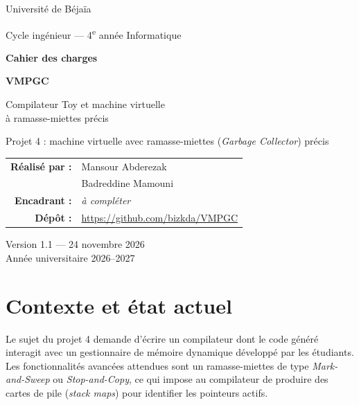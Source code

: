 \documentclass[11pt,a4paper]{article}
\newcommand{\encadrant}{\textit{à compléter}}
\begin{document}
\begin{titlepage}
\centering
{\large Université de Béjaïa\par}
\vspace{2mm}
{\normalsize Cycle ingénieur --- 4\textsuperscript{e} année Informatique\par}

\vspace{3cm}
{\Large\bfseries Cahier des charges\par}
\vspace{6mm}
{\fontsize{34}{40}\selectfont\bfseries VMPGC\par}
\vspace{6mm}
{\large Compilateur Toy et machine virtuelle\\à ramasse-miettes précis\par}
\vspace{8mm}
{\normalsize Projet 4 : machine virtuelle avec ramasse-miettes (\emph{Garbage Collector}) précis\par}

\vfill
\begin{tabular}{rl}
  \textbf{Réalisé par :} & Mansour Abderezak \\
                         & Badreddine Mamouni \\[4mm]
  \textbf{Encadrant :}   & \encadrant \\[4mm]
  \textbf{Dépôt :}       & \url{https://github.com/bizkda/VMPGC} \\
\end{tabular}

\vspace{1.5cm}
Version 1.1 --- 24 novembre 2026\\
Année universitaire 2026--2027
\end{titlepage}

\tableofcontents
\newpage

\section{Contexte et état actuel}

Le sujet du projet 4 demande d'écrire un compilateur dont le code généré interagit avec un gestionnaire de mémoire dynamique développé par les étudiants. Les fonctionnalités avancées attendues sont un ramasse-miettes de type \emph{Mark-and-Sweep} ou \emph{Stop-and-Copy}, ce qui impose au compilateur de produire des cartes de pile (\emph{stack maps}) pour identifier les pointeurs actifs.
\end{document}
